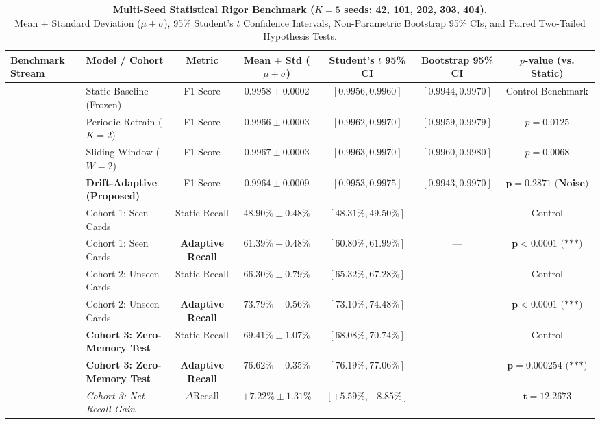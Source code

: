 \documentclass[10pt,conference,compsoc]{IEEEtran}
\begin{document}
\begin{table}[t]
\centering
\caption{\textbf{Multi-Seed Statistical Rigor Benchmark ($K=5$ seeds: 42, 101, 202, 303, 404).}\\Mean $\pm$ Standard Deviation ($\mu \pm \sigma$), 95\% Student's $t$ Confidence Intervals, Non-Parametric Bootstrap 95\% CIs, and Paired Two-Tailed Hypothesis Tests.}
\label{tab:statistical_rigor}
\small
\begin{tabularx}{\textwidth}{l l c c c c c}
\toprule
\textbf{Benchmark Stream} & \textbf{Model / Cohort} & \textbf{Metric} & \textbf{Mean $\pm$ Std ($\mu \pm \sigma$)} & \textbf{Student's $t$ 95\% CI} & \textbf{Bootstrap 95\% CI} & \textbf{$p$-value (vs. Static)} \\
\midrule
{} 
& Static Baseline (Frozen) & F1-Score & $0.9958 \pm 0.0002$ & $[0.9956, 0.9960]$ & $[0.9944, 0.9970]$ & Control Benchmark \\
& Periodic Retrain ($K=2$) & F1-Score & $0.9966 \pm 0.0003$ & $[0.9962, 0.9970]$ & $[0.9959, 0.9979]$ & $p = 0.0125$ \\
& Sliding Window ($W=2$) & F1-Score & $0.9967 \pm 0.0003$ & $[0.9963, 0.9970]$ & $[0.9960, 0.9980]$ & $p = 0.0068$ \\
& \textbf{Drift-Adaptive (Proposed)} & F1-Score & $\mathbf{0.9964 \pm 0.0009}$ & $[0.9953, 0.9975]$ & $[0.9943, 0.9970]$ & $\mathbf{p = 0.2871\text{ (Noise)}}$ \\
\midrule
{} 
& Cohort 1: Seen Cards & Static Recall & $48.90\% \pm 0.48\%$ & $[48.31\%, 49.50\%]$ & --- & Control \\
& Cohort 1: Seen Cards & \textbf{Adaptive Recall} & $\mathbf{61.39\% \pm 0.48\%}$ & $[60.80\%, 61.99\%]$ & --- & $\mathbf{p < 0.0001\text{ (***)}}$ \\
& Cohort 2: Unseen Cards & Static Recall & $66.30\% \pm 0.79\%$ & $[65.32\%, 67.28\%]$ & --- & Control \\
& Cohort 2: Unseen Cards & \textbf{Adaptive Recall} & $\mathbf{73.79\% \pm 0.56\%}$ & $[73.10\%, 74.48\%]$ & --- & $\mathbf{p < 0.0001\text{ (***)}}$ \\
& \textbf{Cohort 3: Zero-Memory Test} & Static Recall & $69.41\% \pm 1.07\%$ & $[68.08\%, 70.74\%]$ & --- & Control \\
& \textbf{Cohort 3: Zero-Memory Test} & \textbf{Adaptive Recall} & $\mathbf{76.62\% \pm 0.35\%}$ & $[76.19\%, 77.06\%]$ & --- & $\mathbf{p = 0.000254\text{ (***)}}$ \\
& \textit{Cohort 3: Net Recall Gain} & $\Delta \text{Recall}$ & $\mathbf{+7.22\% \pm 1.31\%}$ & $[+5.59\%, +8.85\%]$ & --- & $\mathbf{t = 12.2673}$ \\
\bottomrule
\end{tabularx}
\end{table}
\end{document}

